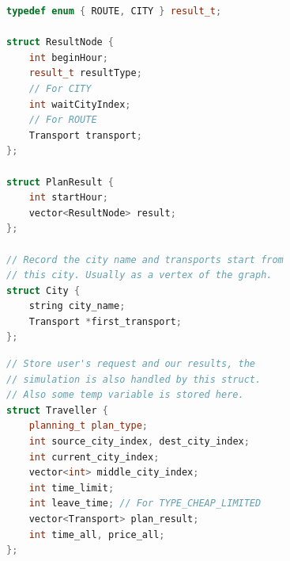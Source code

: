 \documentclass[lang=cn,blue]{elegantbook}
\begin{document}
\begin{lstlisting}[language=C++,caption={City 以及 PlanResult 的定义},captionpos=b]
typedef enum { ROUTE, CITY } result_t;

struct ResultNode {
	int beginHour;
	result_t resultType;
	// For CITY
	int waitCityIndex;
	// For ROUTE
	Transport transport;
};

struct PlanResult {
	int startHour;
	vector<ResultNode> result;
};

// Record the city name and transports start from
// this city. Usually as a vertex of the graph.
struct City {
	string city_name;
	Transport *first_transport;
};
\end{lstlisting}

\begin{lstlisting}[language=C++,caption={Traveller 的定义},captionpos=b]
// Store user's request and our results, the
// simulation is also handled by this struct.
// Also some temp variable is stored here.
struct Traveller {
	planning_t plan_type;
	int source_city_index, dest_city_index;
	int current_city_index;
	vector<int> middle_city_index;
	int time_limit;
	int leave_time; // For TYPE_CHEAP_LIMITED
	vector<Transport> plan_result;
	int time_all, price_all;
};
\end{lstlisting}
\end{document}
